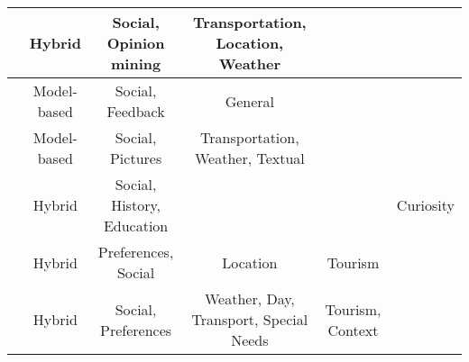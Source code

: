 \begin{table*}[h!]
\begin{tabular}{|c|c|c|c|c|c|}
        \cite{logesh2018personalised} & Hybrid & Social, Opinion mining & Transportation, Location, Weather &  & \\ \hline

        \cite{hidasi2016general} & Model-based & Social, Feedback  & General &  & \\ \hline

        \cite{sun2019building} & Model-based & Social, Pictures & Transportation, Weather, Textual &  & \\ \hline

        \cite{menk2017curumim} & Hybrid & Social, History, Education &  &  & Curiosity \\ \hline

        \cite{garcia2009speta} & Hybrid & Preferences, Social & Location & Tourism & \\ \hline

        \cite{alonso2012ontology} & Hybrid & Social, Preferences & Weather, Day, Transport, Special Needs & Tourism, Context & \\ \hline

    \end{tabular}
    
    \end{table*}



